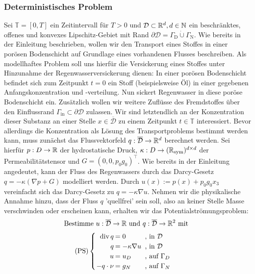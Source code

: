 \subsubsection{Deterministisches Problem}
\label{det_prob}
Sei $\mathbb{T} = [0,T]$ ein Zeitintervall für $T>0$ und $\mathcal{D} \subset \mathbb{R}^d , d \in \mathbb{N}$ ein beschränktes, offenes und konvexes Lipschitz-Gebiet mit Rand $ \partial \mathcal{D} = \Gamma_{\text{D}}  \dot{\cup} \Gamma_{\text{N}} $. 
Wie bereits in der Einleitung beschrieben, wollen wir den Transport eines Stoffes in einer porösen Bodenschicht auf Grundlage eines vorhandenen Flusses beschreiben. 
Als modellhaftes Problem soll uns hierfür die Versickerung eines Stoffes unter Hinzunahme der Regenwasserversickerung dienen: In einer porösen Bodenschicht befindet sich zum Zeitpunkt $t=0$ ein Stoff (beispielsweise Öl) in einer gegebenen Anfangskonzentration und -verteilung. Nun sickert Regenwasser in diese poröse Bodenschicht ein. Zusätzlich wollen wir weitere Zuflüsse des Fremdstoffes über den Einflussrand $\Gamma_{\text{in}} \subset \partial \mathcal{D}$ zulassen.
Wir sind letztendlich an der Konzentration dieser Substanz an einer Stelle $x \in \overline{\mathcal{D}}$ zu einem Zeitpunkt $t \in \mathbb{T}$ interessiert. \newline
Bevor allerdings die Konzentration als Lösung des Transportproblems bestimmt werden kann, muss zunächst das Flussvektorfeld $q: \overline{\mathcal{D}} \rightarrow \mathbb{R}^d$ berechnet werden. \newline
Sei hierfür $p: D \rightarrow \mathbb{R}$ der hydrostatische Druck, $\kappa: D \rightarrow (\mathbb{R}_{\text{sym}})^{d \times d}$ der Permeabilitätstensor und $G=(0,0,p_0 g_0)^{\top}$. 
Wie bereits in der Einleitung angedeutet, kann der Fluss des Regenwassers durch das Darcy-Gesetz $q=-\kappa(\nabla p + G)$ modelliert werden.
Durch $u(x) := p(x) + p_0 g_0 x_3$ vereinfacht sich das Darcy-Gesetz zu $q=-\kappa \nabla u$.\newline
Nehmen wir die physikalische Annahme hinzu, dass der Fluss $q$ 'quellfrei' sein soll, also an keiner Stelle Masse verschwinden oder erscheinen kann, erhalten wir das Potentialströmungsproblem:
\[ \text{Bestimme } u:\overline{\mathcal{D}} \to \R \text{ und } q: \overline{\mathcal{D}} \to \R^2 \text{ mit } \newline \]
\[\setlength\arraycolsep{1pt}
\text{(PS)}\begin{cases} 
\begin{array}{rll}
\dive q     &= 0                 &\text{ , } \text{in } \mathcal{D}\\
q           &= - \kappa \nabla u &\text{ , } \text{in }\mathcal{D}\\
u           &= u_D               &\text{ , } \text{auf } \Gamma_D \\
-q \cdot \nu  &= g_N               &\text{ , } \text{auf } \Gamma_N 
\end{array}
\end{cases} \\
\]
